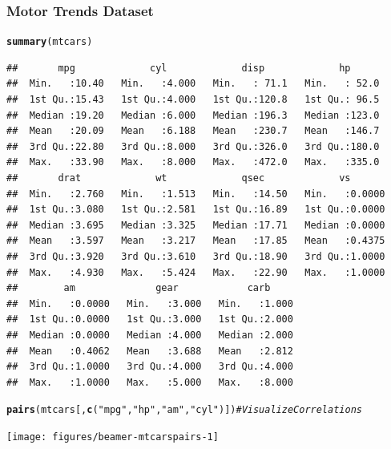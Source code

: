 \documentclass{beamer}\usepackage[]{graphicx}\usepackage[]{color}
\makeatletter
\newcommand{\hlstr}[1]{\textcolor[rgb]{0.192,0.494,0.8}{#1}}%
\newcommand{\hlcom}[1]{\textcolor[rgb]{0.678,0.584,0.686}{\textit{#1}}}%
\newcommand{\hlstd}[1]{\textcolor[rgb]{0.345,0.345,0.345}{#1}}%
\newcommand{\hlkwd}[1]{\textcolor[rgb]{0.737,0.353,0.396}{\textbf{#1}}}%
\newenvironment{kframe}{%
 \def\at@end@of@kframe{}%
 \ifinner\ifhmode%
  \def\at@end@of@kframe{\end{minipage}}%
  \begin{minipage}{\columnwidth}%
 \fi\fi%
 \def\FrameCommand##1{\hskip\@totalleftmargin \hskip-\fboxsep
 \colorbox{shadecolor}{##1}\hskip-\fboxsep
     \hskip-\linewidth \hskip-\@totalleftmargin \hskip\columnwidth}%
 \MakeFramed {\advance\hsize-\width
   \@totalleftmargin\z@ \linewidth\hsize
   \@setminipage}}%
 {\par\unskip\endMakeFramed%
 \at@end@of@kframe}
\newenvironment{knitrout}{}{} %
\makeatother
\begin{document}
\begin{frame}
\frametitle{Motor Trends Dataset}

\begin{knitrout}\tiny
{}\color{fgcolor}\begin{kframe}
\begin{alltt}
\hlkwd{summary}\hlstd{(mtcars)}
\end{alltt}
\begin{verbatim}
##       mpg             cyl             disp             hp       
##  Min.   :10.40   Min.   :4.000   Min.   : 71.1   Min.   : 52.0  
##  1st Qu.:15.43   1st Qu.:4.000   1st Qu.:120.8   1st Qu.: 96.5  
##  Median :19.20   Median :6.000   Median :196.3   Median :123.0  
##  Mean   :20.09   Mean   :6.188   Mean   :230.7   Mean   :146.7  
##  3rd Qu.:22.80   3rd Qu.:8.000   3rd Qu.:326.0   3rd Qu.:180.0  
##  Max.   :33.90   Max.   :8.000   Max.   :472.0   Max.   :335.0  
##       drat             wt             qsec             vs        
##  Min.   :2.760   Min.   :1.513   Min.   :14.50   Min.   :0.0000  
##  1st Qu.:3.080   1st Qu.:2.581   1st Qu.:16.89   1st Qu.:0.0000  
##  Median :3.695   Median :3.325   Median :17.71   Median :0.0000  
##  Mean   :3.597   Mean   :3.217   Mean   :17.85   Mean   :0.4375  
##  3rd Qu.:3.920   3rd Qu.:3.610   3rd Qu.:18.90   3rd Qu.:1.0000  
##  Max.   :4.930   Max.   :5.424   Max.   :22.90   Max.   :1.0000  
##        am              gear            carb      
##  Min.   :0.0000   Min.   :3.000   Min.   :1.000  
##  1st Qu.:0.0000   1st Qu.:3.000   1st Qu.:2.000  
##  Median :0.0000   Median :4.000   Median :2.000  
##  Mean   :0.4062   Mean   :3.688   Mean   :2.812  
##  3rd Qu.:1.0000   3rd Qu.:4.000   3rd Qu.:4.000  
##  Max.   :1.0000   Max.   :5.000   Max.   :8.000
\end{verbatim}
\end{kframe}
\end{knitrout}

\begin{knitrout}\tiny
{}\color{fgcolor}\begin{kframe}
\begin{alltt}
\hlkwd{pairs}\hlstd{(mtcars[,} \hlkwd{c}\hlstd{(}\hlstr{"mpg"}\hlstd{,} \hlstr{"hp"}\hlstd{,} \hlstr{"am"}\hlstd{,} \hlstr{"cyl"}\hlstd{)])}  \hlcom{# Visualize Correlations}
\end{alltt}
\end{kframe}

{\centering \texttt{[image: figures/beamer-mtcarspairs-1]} 

}



\end{knitrout}
\end{frame}
\end{document}
